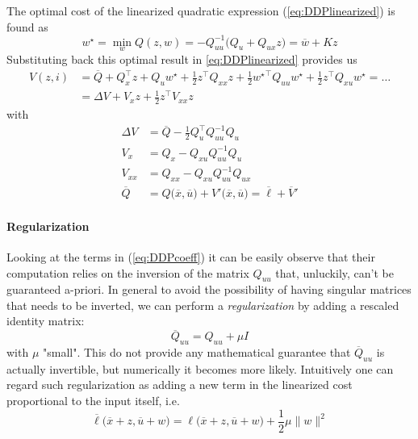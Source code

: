 	The optimal cost of the linearized quadratic expression (\ref{eq:DDPlinearized}) is found as
	\begin{equation} \label{eq:DDPoptinput}
		w^\star = \min_w Q(z,w) = - Q_{uu}^{-1} \big(Q_u + Q_{ux} z\big) = \overline w + K z
	\end{equation}
	Substituting back this optimal result in \ref{eq:DDPlinearized} provides us
	\begin{equation}
	\begin{aligned}
		V(z, i) & = \overline Q + Q_x^\top z + Q_u w^\star + \frac 1 2 z^\top Q_{xx} z + \frac 1 2 {w^\star}^\top Q_{uu} w^\star + \frac 1 2 z^\top Q_{xu} w^\star = \dots \\
		& = \Delta V + V_x z + \frac 12 z^\top V_{xx} z
	\end{aligned}
	\end{equation}
	with
	\begin{equation} \label{eq:DDPcoeff}
	\begin{aligned}
		\Delta V & = \overline Q - \frac 1 2 Q_u^\top Q_{uu}^{-1} Q_u \\ 
		V_x & = Q_x - Q_{xu}Q_{uu}^{-1} Q_u \\
		V_{xx} & = Q_{xx} - Q_{xu}Q_{uu}^{-1}Q_{ux} \\ 
		\overline Q & = Q\big(\overline x , \overline u\big) + V'\big(\overline x, \overline u\big) = \overline \ell + \overline V'
	\end{aligned}
	\end{equation}

	\paragraph{Regularization} Looking at the terms in (\ref{eq:DDPcoeff}) it can be easily observe that their computation relies on the inversion of the matrix $Q_{uu}$ that, unluckily, can't be guaranteed a-priori. In general to avoid the possibility of having singular matrices that needs to be inverted, we can perform a \textit{regularization} by adding a rescaled identity matrix:
	\begin{equation}
		\overline Q_{uu} = Q_{uu} + \mu I
	\end{equation}
	with $\mu$ "small". This do not provide any mathematical guarantee that $\overline Q_{uu}$ is actually invertible, but numerically it becomes more likely. Intuitively one can regard such regularization as adding a new term in the linearized cost proportional to the input itself, i.e.
	\[ \overline \ell \big(\overline x + z, \overline u + w\big) = \ell \big(\overline x + z, \overline u + w\big) + \frac 1 2 \mu \|w\|^2  \]
	
